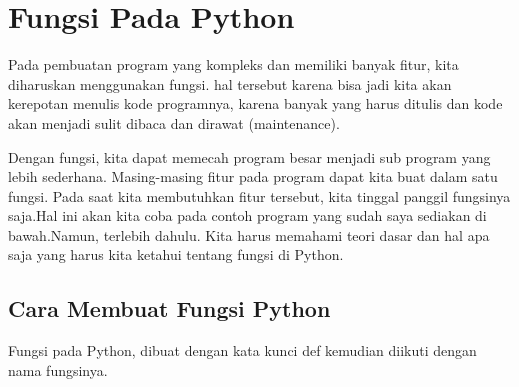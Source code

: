 \chapter{Fungsi Pada Python}
\par Pada pembuatan program yang kompleks dan memiliki banyak fitur, kita diharuskan menggunakan fungsi. hal tersebut karena bisa jadi kita akan kerepotan menulis kode programnya, karena banyak yang harus ditulis dan kode akan menjadi sulit dibaca dan dirawat (maintenance).
\par Dengan fungsi, kita dapat memecah program besar menjadi sub program yang lebih sederhana. Masing-masing fitur pada program dapat kita buat dalam satu fungsi. Pada saat kita membutuhkan fitur tersebut, kita tinggal panggil fungsinya saja.Hal ini akan kita coba pada contoh program yang sudah saya sediakan di bawah.Namun, terlebih dahulu. Kita harus memahami teori dasar dan hal apa saja yang harus kita ketahui tentang fungsi di Python.
\section{Cara Membuat Fungsi Python}
Fungsi pada Python, dibuat dengan kata kunci def kemudian diikuti dengan nama fungsinya.

